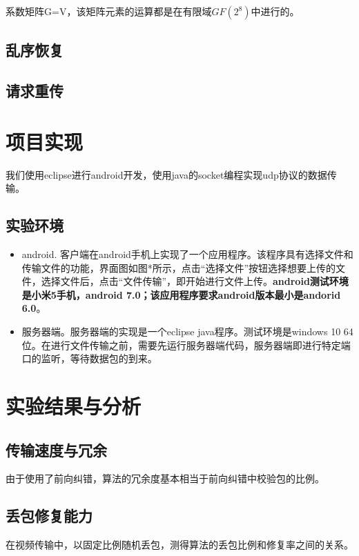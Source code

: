 \documentclass[onecolumn]{article}
\begin{document}
\begin{CJK*}{UTF8}{gbsn}
系数矩阵G=V，该矩阵元素的运算都是在有限域$GF(2^8)$中进行的。

\subsection{乱序恢复}

\subsection{请求重传}


\section{项目实现}
我们使用eclipse进行android开发，使用java的socket编程实现udp协议的数据传输。
\subsection{实验环境}
\begin{itemize}
\item android. 客户端在android手机上实现了一个应用程序。该程序具有选择文件和传输文件的功能，界面图如图*所示，点击“选择文件”按钮选择想要上传的文件，选择文件后，点击“文件传输”，即开始进行文件上传。\textbf{android测试环境是小米5手机，android 7.0；该应用程序要求android版本最小是andorid 6.0}。
\item 服务器端。服务器端的实现是一个eclipse java程序。测试环境是windows 10 64位。在进行文件传输之前，需要先运行服务器端代码，服务器端即进行特定端口的监听，等待数据包的到来。 
\end{itemize}

\section{实验结果与分析}
\subsection{传输速度与冗余}
由于使用了前向纠错，算法的冗余度基本相当于前向纠错中校验包的比例。
\subsection{丢包修复能力}
在视频传输中，以固定比例随机丢包，测得算法的丢包比例和修复率之间的关系。
\end{CJK*}
\end{document}
